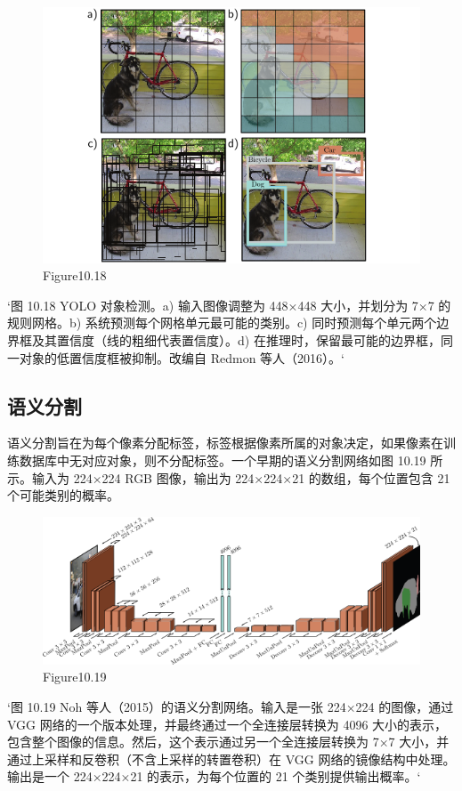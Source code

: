 \begin{figure}[h!]
\centering
\includegraphics[width=0.7\linewidth]{png/chapter10/ConvYOLO.png}
\caption{Figure10.18}
\end{figure}

`图 10.18 YOLO 对象检测。a) 输入图像调整为 448×448 大小，并划分为 7×7 的规则网格。b) 系统预测每个网格单元最可能的类别。c) 同时预测每个单元两个边界框及其置信度（线的粗细代表置信度）。d) 在推理时，保留最可能的边界框，同一对象的低置信度框被抑制。改编自 Redmon 等人（2016）。`

\subsection{语义分割}
语义分割旨在为每个像素分配标签，标签根据像素所属的对象决定，如果像素在训练数据库中无对应对象，则不分配标签。一个早期的语义分割网络如图 10.19 所示。输入为 224×224 RGB 图像，输出为 224×224×21 的数组，每个位置包含 21 个可能类别的概率。

\begin{figure}[h!]
\centering
\includegraphics[width=0.7\linewidth]{png/chapter10/ConvSemSeg.png}
\caption{Figure10.19}
\end{figure}
`图 10.19 Noh 等人（2015）的语义分割网络。输入是一张 224×224 的图像，通过 VGG 网络的一个版本处理，并最终通过一个全连接层转换为 4096 大小的表示，包含整个图像的信息。然后，这个表示通过另一个全连接层转换为 7×7 大小，并通过上采样和反卷积（不含上采样的转置卷积）在 VGG 网络的镜像结构中处理。输出是一个 224×224×21 的表示，为每个位置的 21 个类别提供输出概率。`

